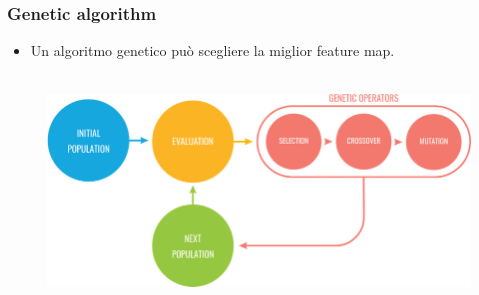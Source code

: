 \documentclass{beamer}
\begin{document}
\begin{frame}
  \frametitle{Genetic algorithm}
  \begin{itemize}
    \item Un algoritmo genetico può scegliere la miglior feature map.\\\,
  \end{itemize}

  \begin{figure}
    \includegraphics[width=\textwidth]{images/genetic.png}
  \end{figure} 
\end{frame}
\end{document}
